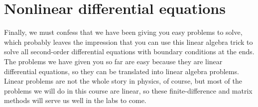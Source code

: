 \section*{Nonlinear differential equations}
Finally, we must confess that we have been giving you easy problems to solve,
which probably leaves the impression that you can use this linear algebra trick
to solve all second-order differential equations with boundary conditions at the
ends. The problems we have given you so far are easy because they are linear
differential equations, so they can be translated into linear algebra problems.
Linear problems are not the whole story in physics, of course, but most of the
problems we will do in this course are linear, so these finite-difference and matrix
methods will serve us well in the labs to come.

